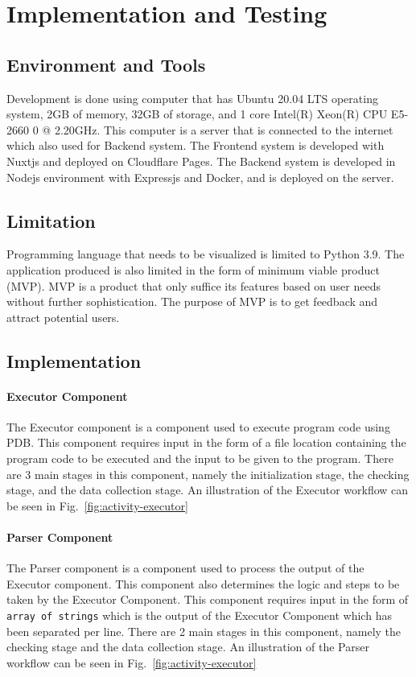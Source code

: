 \documentclass[conference]{IEEEtran}
\begin{document}
\section{Implementation and Testing}
\subsection{Environment and Tools}
Development is done using computer that has Ubuntu 20.04 LTS operating system, 2GB of memory, 32GB of storage, and 1 core Intel(R) Xeon(R) CPU E5-2660 0 @ 2.20GHz. This computer is a server that is connected to the internet which also used for Backend system.
The Frontend system is developed with Nuxtjs and deployed on Cloudflare Pages. The Backend system is developed in Nodejs environment with Expressjs and Docker, and is deployed on the server.

\subsection{Limitation}
Programming language that needs to be visualized is limited to Python 3.9. The application produced is also limited in the form of minimum viable product (MVP). MVP is a product that only suffice its features based on user needs without further sophistication. The purpose of MVP is to get feedback and attract potential users.

\subsection{Implementation}
\paragraph{Executor Component}
The Executor component is a component used to execute program code using PDB. This component requires input in the form of a file location containing the program code to be executed and the input to be given to the program. There are 3 main stages in this component, namely the initialization stage, the checking stage, and the data collection stage. An illustration of the Executor workflow can be seen in Fig.~\ref{fig:activity-executor}
\paragraph{Parser Component}
The Parser component is a component used to process the output of the Executor component. This component also determines the logic and steps to be taken by the Executor Component. This component requires input in the form of \verb|array of strings| which is the output of the Executor Component which has been separated per line. There are 2 main stages in this component, namely the checking stage and the data collection stage. An illustration of the Parser workflow can be seen in Fig.~\ref{fig:activity-executor}
\end{document}
